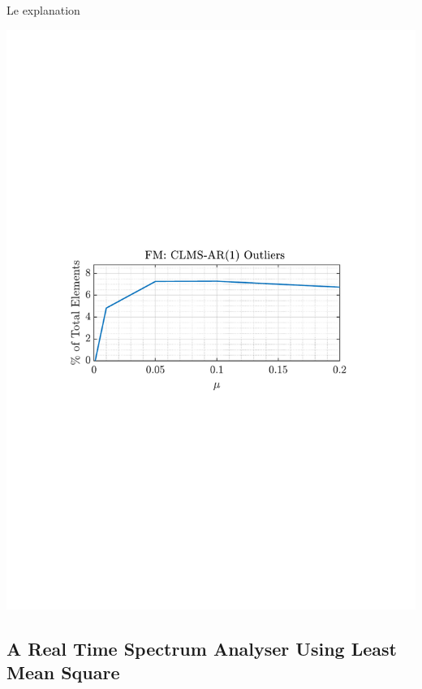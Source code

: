 \documentclass[12pt]{article}
\begin{document}
			\begin{minipage}[b]{0.49\textwidth}
				Le explanation
			\end{minipage}%
			\begin{minipage}{0.04\textwidth}
				\hspace*{0.04\textwidth}
			\end{minipage}%
			\begin{minipage}{0.49\textwidth}
				\centering
				\includegraphics[trim={2.2cm 11.2cm 3.15cm  11.2cm}, clip, width=\textwidth]{../MATLAB/figures/q3_2b_fig06.pdf} 

				\captionsetup{justification=centering}
				\label{fig: 3-2c-outliers}
			\end{minipage}%
	\subsection{A Real Time Spectrum Analyser Using Least Mean Square} \label{sec: 3-3-real-time-spectrum-LMS}
\end{document}
